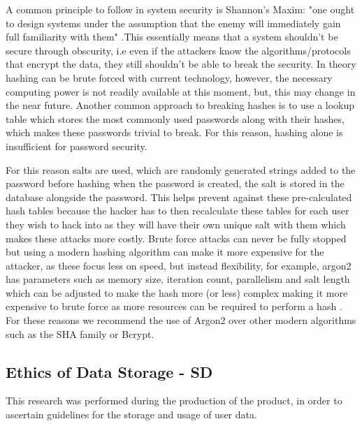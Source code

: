 \documentclass[10pt, notitlepage]{report}
\begin{document}
A common principle to follow in system security is Shannon's Maxim: "one ought to design systems under the assumption that the enemy will immediately gain full familiarity with them" \cite{Shannon1949}.This essentially means that a system shouldn’t be secure through obscurity, i.e even if the attackers know the algorithms/protocols that encrypt the data, they still shouldn’t be able to break the security. In theory hashing can be brute forced with current technology, however, the necessary computing power is not readily available at this moment, but, this may change in the near future. Another common approach to breaking hashes is to use a lookup table which stores the most commonly used passwords along with their hashes, which makes these passwords trivial to break. For this reason, hashing alone is insufficient for password security. \cite{Tsudik1992}

For this reason salts are used, which are randomly generated strings added to the password before hashing when the password is created, the salt is stored in the database alongside the password. This helps prevent against these pre-calculated hash tables because the hacker has to then recalculate these tables for each user they wish to hack into as they will have their own unique salt with them which makes these attacks more costly. Brute force attacks can never be fully stopped but using a modern hashing algorithm can make it more expensive for the attacker, as these focus less on speed, but instead flexibility, for example, argon2 has parameters such as memory size, iteration count, parallelism and salt length which can be adjusted to make the hash more (or less) complex making it more expensive to brute force as more resources can be required to perform a hash \cite{Biryukov2016}. For these reasons we recommend the use of Argon2 over other modern algorithms such as the SHA family or Bcrypt.

\subsection{Ethics of Data Storage - SD}
\label{res:datastor}

This research was performed during the production of the product, in order to ascertain guidelines for the storage and usage of user data.\newline
\end{document}
